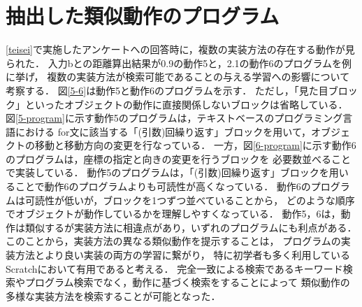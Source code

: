 \documentclass[11pt]{jreport}
\begin{document}
\section{抽出した類似動作のプログラム}
\ref{teisei}で実施したアンケートへの回答時に，複数の実装方法の存在する動作が見られた．
入力bとの距離算出結果が0.9の動作5と，2.1の動作6のプログラムを例に挙げ，
複数の実装方法が検索可能であることの与える学習への影響について考察する．
図\ref{5-6}は動作5と動作6のプログラムを示す．
ただし，「見た目ブロック」といったオブジェクトの動作に直接関係しないブロックは省略している．
図\ref{5-program}に示す動作5のプログラムは，テキストベースのプログラミング言語における
for文に該当する「(引数)回繰り返す」ブロックを用いて，オブジェクトの移動と移動方向の変更を行なっている．
一方，図\ref{6-program}に示す動作6のプログラムは，座標の指定と向きの変更を行うブロックを
必要数並べることで実装している．
動作5のプログラムは，「(引数)回繰り返す」ブロックを用いることで動作6のプログラムよりも可読性が高くなっている．
動作6のプログラムは可読性が低いが，ブロックを1つずつ並べていることから，
どのような順序でオブジェクトが動作しているかを理解しやすくなっている．
動作5，6は，動作は類似するが実装方法に相違点があり，いずれのプログラムにも利点がある．
このことから，実装方法の異なる類似動作を提示することは，
プログラムの実装方法とより良い実装の両方の学習に繋がり，
特に初学者も多く利用しているScratchにおいて有用であると考える．
完全一致による検索であるキーワード検索やプログラム検索でなく，動作に基づく検索をすることによって
類似動作の多様な実装方法を検索することが可能となった．
\end{document}
